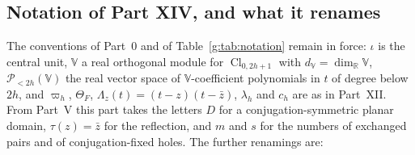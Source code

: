 \documentclass[11pt,a4paper]{article}
\numberwithin{equation}{section}
\theoremstyle{definition}
\theoremstyle{remark}
\theoremstyle{plain}
\newcommand{\RR}{\mathbb R}
\newcommand{\VV}{\mathbb V}                       %
\newcommand{\dV}{d_{\VV}}                         %
\newcommand{\PolH}{\mathscr P_{<2h}(\VV)}
\newcommand{\cur}{\varpi}                         %
\newcommand{\Herm}{\Theta}                        %
\newcommand{\Rq}{\Lambda}                         %
\begin{document}
\subsection{Notation of Part XIV, and what it renames}
\label{h:sub:notation}

The conventions of Part~0 and of Table~\ref{g:tab:notation} remain in force:
$\iota$ is the central unit, $\VV$ a real orthogonal module for
$\operatorname{Cl}_{0,2h+1}$ with $\dV=\dim_\RR\VV$, $\PolH$ the real vector
space of $\VV$-coefficient polynomials in $t$ of degree below $2h$, and
$\cur_h$, $\Herm_F$, $\Rq_z(t)=(t-z)(t-\bar z)$, $\lambda_h$ and $c_h$ are
as in Part~XII. From Part~V this part takes the letters $D$ for a
conjugation-symmetric planar domain, $\tau(z)=\bar z$ for the reflection, and
$m$ and $s$ for the numbers of exchanged pairs and of conjugation-fixed holes.
The further renamings are:
\end{document}

